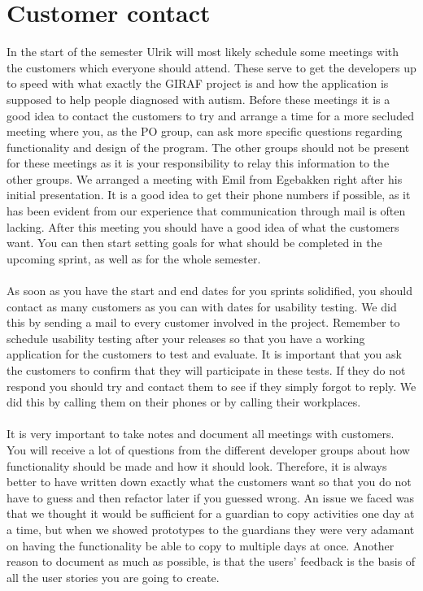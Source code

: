 \section{Customer contact}
In the start of the semester Ulrik will most likely schedule some meetings with the customers which everyone should attend.
These serve to get the developers up to speed with what exactly the GIRAF project is and how the application is supposed to help people diagnosed with autism.
Before these meetings it is a good idea to contact the customers to try and arrange a time for a more secluded meeting where you, as the PO group, can ask more specific questions regarding functionality and design of the program.
The other groups should not be present for these meetings as it is your responsibility to relay this information to the other groups.
We arranged a meeting with Emil from Egebakken right after his initial presentation.
It is a good idea to get their phone numbers if possible, as it has been evident from our experience that communication through mail is often lacking.
After this meeting you should have a good idea of what the customers want.
You can then start setting goals for what should be completed in the upcoming sprint, as well as for the whole semester.
\\\\
As soon as you have the start and end dates for you sprints solidified, you should contact as many customers as you can with dates for usability testing. 
We did this by sending a mail to every customer involved in the project.
Remember to schedule usability testing after your releases so that you have a working application for the customers to test and evaluate.
It is important that you ask the customers to confirm that they will participate in these tests.
If they do not respond you should try and contact them to see if they simply forgot to reply.
We did this by calling them on their phones or by calling their workplaces.
\\\\
It is very important to take notes and document all meetings with customers.
You will receive a lot of questions from the different developer groups about how functionality should be made and how it should look.
Therefore, it is always better to have written down exactly what the customers want so that you do not have to guess and then refactor later if you guessed wrong.
An issue we faced was that we thought it would be sufficient for a guardian to copy activities one day at a time, but when we showed prototypes to the guardians they were very adamant on having the functionality be able to copy to multiple days at once.
Another reason to document as much as possible, is that the users' feedback is the basis of all the user stories you are going to create.

